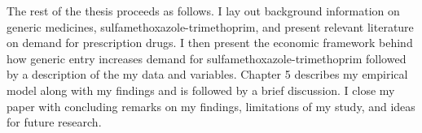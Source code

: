 \indent The rest of the thesis proceeds as follows. I lay out background information on generic medicines, sulfamethoxazole-trimethoprim, and present relevant literature on demand for prescription drugs. I then present the economic framework behind how generic entry increases demand for sulfamethoxazole-trimethoprim followed by a description of the my data and variables. Chapter 5 describes my empirical model along with my findings and is followed by a brief discussion. I close my paper with concluding remarks on my findings, limitations of my study, and ideas for future research.
